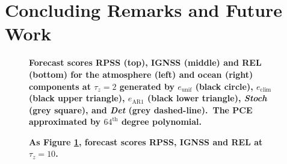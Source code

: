 \documentclass[times]{qjrms4}
\begin{document}
\section{Concluding Remarks and Future Work}
	
%	

       \begin{figure}[h]
                \caption{\bf \label{scoreTau2}
                        Forecast scores RPSS (top), IGNSS (middle) and REL (bottom) for
                        the atmosphere (left) and ocean (right) components at $\tau_z=2$ generated by
                        $e_{\text{unif}}$ (black circle), $e_{\text{clim}}$ (black upper triangle), $e_{\text{AR1}}$ (black lower triangle),
                        \emph{Stoch} (grey square), and \emph{Det} (grey dashed-line).\
                        The PCE approximated by $64^{\text{th}}$ degree polynomial.\
                        }
        \end{figure}
        \begin{figure}[h]
                \caption{\bf  \label{scoreTau10}
                        As Figure {\ref{scoreTau2}}, forecast scores RPSS, IGNSS and REL at $\tau_z=10$.\
                        }       
        \end{figure}
\end{document}
